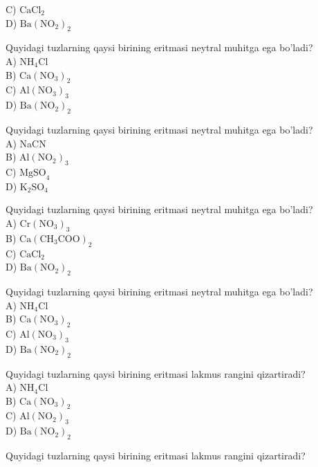 C) $\mathrm{CaCl}_{2}$\\
D) $\mathrm{Ba}\left(\mathrm{NO}_{2}\right)_{2}$
  \item Quyidagi tuzlarning qaysi birining eritmasi neytral muhitga ega bo'ladi?\\
A) $\mathrm{NH}_{4} \mathrm{Cl}$\\
B) $\mathrm{Ca}\left(\mathrm{NO}_{3}\right)_{2}$\\
C) $\mathrm{Al}\left(\mathrm{NO}_{3}\right)_{3}$\\
D) $\mathrm{Ba}\left(\mathrm{NO}_{2}\right)_{2}$
  \item Quyidagi tuzlarning qaysi birining eritmasi neytral muhitga ega bo'ladi?\\
A) NaCN\\
B) $\mathrm{Al}\left(\mathrm{NO}_{2}\right)_{3}$\\
C) $\mathrm{MgSO}_{4}$\\
D) $\mathrm{K}_{2} \mathrm{SO}_{4}$
  \item Quyidagi tuzlarning qaysi birining eritmasi neytral muhitga ega bo'ladi?\\
A) $\mathrm{Cr}\left(\mathrm{NO}_{3}\right)_{3}$\\
B) $\mathrm{Ca}\left(\mathrm{CH}_{3} \mathrm{COO}\right)_{2}$\\
C) $\mathrm{CaCl}_{2}$\\
D) $\mathrm{Ba}\left(\mathrm{NO}_{2}\right)_{2}$
  \item Quyidagi tuzlarning qaysi birining eritmasi neytral muhitga ega bo'ladi?\\
A) $\mathrm{NH}_{4} \mathrm{Cl}$\\
B) $\mathrm{Ca}\left(\mathrm{NO}_{3}\right)_{2}$\\
C) $\mathrm{Al}\left(\mathrm{NO}_{3}\right)_{3}$\\
D) $\mathrm{Ba}\left(\mathrm{NO}_{2}\right)_{2}$
  \item Quyidagi tuzlarning qaysi birining eritmasi lakmus rangini qizartiradi?\\
A) $\mathrm{NH}_{4} \mathrm{Cl}$\\
B) $\mathrm{Ca}\left(\mathrm{NO}_{3}\right)_{2}$\\
C) $\mathrm{Al}\left(\mathrm{NO}_{2}\right)_{3}$\\
D) $\mathrm{Ba}\left(\mathrm{NO}_{2}\right)_{2}$\\
  \item Quyidagi tuzlarning qaysi birining eritmasi lakmus rangini qizartiradi?\\
